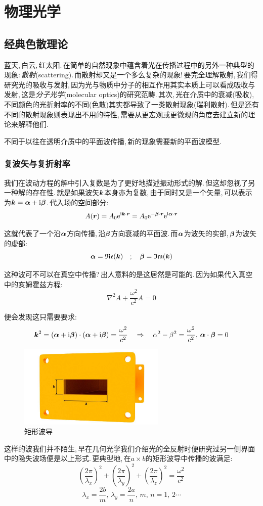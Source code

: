 \chapter{物理光学}


\section{经典色散理论}

蓝天,\,白云,\,红太阳.\,在简单的自然现象中蕴含着光在传播过程中的另外一种典型的现象:\,\emph{散射}(scattering).\,而散射却又是一个多么复杂的现象!\,要完全理解散射,\,我们得研究光的吸收与发射,\,因为光与物质中分子的相互作用其实本质上可以看成吸收与发射,\,这是\emph{分子光学}(molecular optics)的研究范畴.\,其次,\,光在介质中的衰减(吸收),\,不同颜色的光折射率的不同(色散)其实都导致了一类散射现象(瑞利散射).\,但是还有不同的散射现象则表现出不用的特性,\,需要从更宏观或更微观的角度去建立新的理论来解释他们.

不同于以往在透明介质中的平面波传播,\,新的现象需要新的平面波模型.

\subsection{复波矢与复折射率}

我们在波动方程的解中引入复数是为了更好地描述振动形式的解.\,但这却忽视了另一种解的存在性.\,就是如果波矢$\boldsymbol{k}$本身亦为复数,\,由于同时又是一个矢量,\,可以表示为$\boldsymbol{k}=\boldsymbol{\alpha}+{\rm i}\boldsymbol{\beta}$.\,代入场的空间部分:
\[A(\boldsymbol{r})=A_0{\rm e}^{{\rm i} \boldsymbol{k}\cdot \boldsymbol{r}}=A_0{\rm e}^{- \boldsymbol{\beta}\cdot \boldsymbol{r}}{\rm e}^{{\rm i} \boldsymbol{\alpha}\cdot \boldsymbol{r}}\]

这就代表了一个沿$\boldsymbol{\alpha}$方向传播,\,沿$\boldsymbol{\beta}$方向衰减的平面波.\,而$\boldsymbol{\alpha}$为波矢的实部,\,$\boldsymbol{\beta}$为波矢的虚部:
\[\boldsymbol{\alpha} =\mathfrak{Re} (\boldsymbol{k})\quad;\quad \boldsymbol{\beta}=\mathfrak{Im} (\boldsymbol{k})\]

这种波可不可以在真空中传播?\,出人意料的是这居然是可能的.\,因为如果代入真空中的亥姆霍兹方程:
\[\nabla ^2 A+\frac{\omega^2}{c^2}A=0\]

便会发现这只需要要求:
\[\boldsymbol{k}^2=(\boldsymbol{\alpha}+{\rm i} \boldsymbol{\beta})\cdot(\boldsymbol{\alpha}+{\rm i} \boldsymbol{\beta})=\frac{\omega^2}{c^2} \quad \Rightarrow \quad \alpha^2-\beta^2=\frac{\omega^2}{c^2},\,\boldsymbol{\alpha}\cdot\boldsymbol{\beta}=0\]

\begin{figure}
\centering
\includegraphics[width=7cm]{image/16-1-1.jpg}
\caption{矩形波导}
\end{figure}
这样的波我们并不陌生,\,早在几何光学我们介绍光的全反射时便研究过另一侧界面中的隐失波场便是以上形式.\,更典型地,\,在$a\times b$的矩形波导中传播的波满足:
\[(\frac{2\pi}{\lambda_x})^2+(\frac{2\pi}{\lambda_y})^2+(\frac{2\pi}{\lambda_z})^2=\frac{\omega^2}{c^2} \]
\[\lambda_x=\frac{2b}{m},\, \lambda_y=\frac{2a}{n},\,m,\,n=1,\,2\cdots\]


